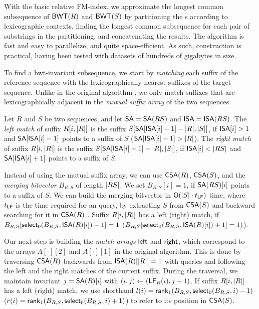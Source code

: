 With the basic relative FM-index, we approximate the longest common
subsequence of $\mathsf{BWT}(R)$ and $\mathsf{BWT}(S)$ by partitioning the \BWT{}s according
to lexicographic contexts, finding the longest common subsequence for each
pair of substrings in the partitioning, and concatenating the results. The
algorithm is fast and easy to parallelize, and quite space-efficient. As such,
\RFM{} construction is practical, having been tested with datasets of hundreds
of gigabytes in size.

To find a bwt-invariant subsequence, we start by \emph{matching} each suffix
of the reference sequence with the lexicographically nearest suffixes of the
target sequence. Unlike in the original algorithm \cite{Belazzougui2014}, we
only match suffixes that are lexicographically adjacent in the \emph{mutual
suffix array} of the two sequences.

\begin{definition}
Let $R$ and $S$ be two sequences, and let $\mathsf{SA} = \mathsf{SA}(RS)$ and $\mathsf{ISA} =
\mathsf{ISA}(RS)$. The \emph{left match} of suffix $R[i,\lvert R \rvert]$ is the suffix
$S[\mathsf{SA}[\mathsf{ISA}[i]-1] - \lvert R \rvert, \lvert S \rvert]$, if $\mathsf{ISA}[i] > 1$ and
$\mathsf{SA}[\mathsf{ISA}[i]-1]$ points to a suffix of $S$ ($\mathsf{SA}[\mathsf{ISA}[i]-1] > \lvert R \rvert$).
The \emph{right match} of suffix $R[i,\lvert R \rvert]$ is the suffix
$S[\mathsf{SA}[\mathsf{ISA}[i]+1] - \lvert R \rvert, \lvert S \rvert]$, if $\mathsf{ISA}[i] < \lvert RS \rvert$ and
$\mathsf{SA}[\mathsf{ISA}[i]+1]$ points to a suffix of $S$.
\end{definition}

Instead of using the mutual suffix array, we can use $\mathsf{CSA}(R)$, $\mathsf{CSA}(S)$,
and the \emph{merging bitvector} $B_{R,S}$ of length $\lvert RS \rvert$. We set
$B_{R,S}[i] = 1$, if $\mathsf{SA}(RS)[i]$ points to a suffix of $S$. We can build the
merging bitvector in $\mathsf{O}(\lvert S \rvert \cdot t_{\mathsf{LF}})$ time, where $t_{\mathsf{LF}}$ is
the time required for an \LF{} query, by extracting $S$ from $\mathsf{CSA}(S)$ and
backward searching for it in $\mathsf{CSA}(R)$ \cite{Siren2009}. Suffix
$R[i,\lvert R \rvert]$ has a left (right) match, if $B_{R,S}[\mathsf{select}_{0}(B_{R,S},
\mathsf{ISA}(R)[i])-1] = 1$ ($B_{R,S}[\mathsf{select}_{0}(B_{R,S}, \mathsf{ISA}(R)[i])+1] = 1)$).

Our next step is building the \emph{match arrays} $\mathsf{left}$ and $\mathsf{right}$,
which correspond to the arrays $A[\cdot][2]$ and $A[\cdot][1]$ in the original
algorithm. This is done by traversing $\mathsf{CSA}(R)$ backwards from
$\mathsf{ISA}(R)[\lvert R \rvert] = 1$ with \LF{} queries and following the left and the
right matches of the current suffix. During the traversal, we maintain
invariant $j = \mathsf{SA}(R)[i]$ with $(i,j) \leftarrow (\mathsf{LF}_{R}(i), j-1)$. If
suffix $R[i,\lvert R \rvert]$ has a left (right) match, we use shorthand $l(i) =
\mathsf{rank}_{1}(B_{R,S}, \mathsf{select}_{0}(B_{R,S}, i)-1)$ ($r(i) = \mathsf{rank}_{1}(B_{R,S},
\mathsf{select}_{0}(B_{R,S}, i)+1)$) to refer to its position in $\mathsf{CSA}(S)$.

